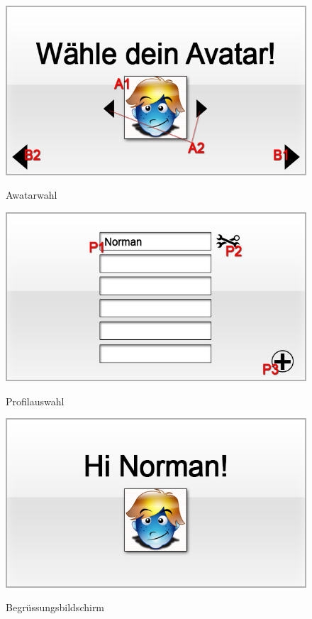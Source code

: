 \begin{figure}[H]
\centering
{}\label{fig:Awatarauswahl}
\includegraphics[scale=0.55]{../GUI-Entwurf/_jpeg_numeration/registration3.jpg}
\caption{Awatarwahl}
\end{figure}

\begin{figure}[H]
\centering
{}\label{fig:Profilauswahl}
\includegraphics[scale=0.55]{../GUI-Entwurf/_jpeg_numeration/choose_profile.jpg}
\caption{Profilauswahl}
\end{figure}

\begin{figure}[H]
\centering
{}\label{fig:Welcome}
\includegraphics[scale=0.55]{../GUI-Entwurf/_jpeg_numeration/welcome.jpg}
\caption{Begrüssungsbildschirm}
\end{figure}

